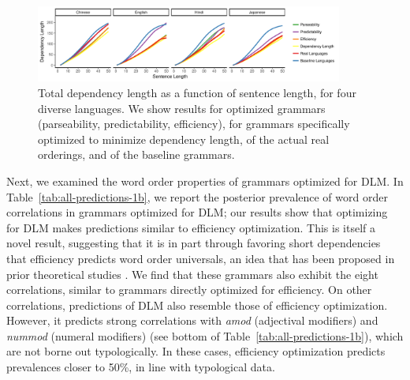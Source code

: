 \documentclass[10pt,twoside,lineno]{article}
\begin{document}
\begin{figure}[ht]
    \centering
	\includegraphics[width=0.9\textwidth]{depLength-facet-1.png} %
        \caption{Total dependency length as a function of sentence length, for four diverse languages. We show results for optimized grammars (parseability, predictability, efficiency), for grammars specifically optimized to minimize dependency length, of the actual real orderings, and of the baseline grammars.}
    \label{fig:dlm-4langs}
\end{figure}


Next, we examined the word order properties of grammars optimized for DLM.
In Table~\ref{tab:all-predictions-1b}, we report the posterior prevalence of word order correlations in grammars optimized for DLM; our results show that optimizing for DLM makes predictions similar to efficiency optimization.
This is itself a novel result, suggesting that it is in part through favoring short dependencies that efficiency predicts word order universals, an idea that has been proposed in prior theoretical studies \citep{hawkins1994performance, hawkins2004efficiency}.
We find that these grammars also exhibit the eight correlations, similar to grammars directly optimized for efficiency.
On other correlations, predictions of DLM also resemble those of efficiency optimization.
However, it predicts strong correlations with \textit{amod} (adjectival modifiers) and \textit{nummod} (numeral modifiers) (see bottom of Table~\ref{tab:all-predictions-1b}), which are not borne out typologically.
In these cases, efficiency optimization predicts prevalences closer to 50\%, in line with typological data.
\end{document}
